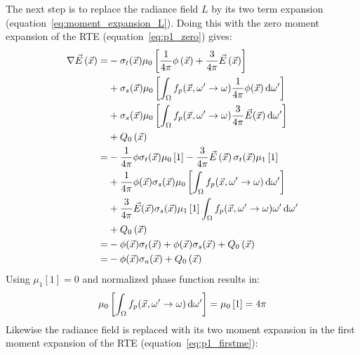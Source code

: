 The next step is to replace the radiance field $L$ by its two term expansion (equation~\ref{eq:moment_expansion_L}). Doing this with the zero moment expansion of the RTE (equation~\ref{eq:p1_zero}) gives:
\begin{align*}
\nabla\vec{E}\left(\vec{x}\right)=
&
-\sigma_t(\vec{x})\mu_0\left[\frac{1}{4\pi}\phi\left(\vec{x}\right) + \frac{3}{4\pi}\vec{E}\left(\vec{x}\right)\right]
\\
&
+\sigma_s(\vec{x})\mu_0\left[\int_{\Omega}f_p(\vec{x}, \omega'\rightarrow\omega)\frac{1}{4\pi}\phi(\vec{x})\,\mathrm{d}\omega'\right]
\\
&
+\sigma_s(\vec{x})\mu_0\left[\int_{\Omega}f_p(\vec{x}, \omega'\rightarrow\omega)\frac{3}{4\pi}\vec{E}(\vec{x})\,\mathrm{d}\omega'\right]
\\
&
\nonumber
+ Q_0\left(\vec{x}\right)
\\
=&
-\frac{1}{4\pi}\phi\sigma_t(\vec{x})\mu_0\left[1\right] - \frac{3}{4\pi}\vec{E}\left(\vec{x}\right)\sigma_t(\vec{x})\mu_1\left[1\right]
\\
&
+\frac{1}{4\pi}\phi(\vec{x})\sigma_s(\vec{x})\mu_0\left[\int_{\Omega}f_p(\vec{x}, \omega'\rightarrow\omega)\,\mathrm{d}\omega'\right]
\\
&
+\frac{3}{4\pi}\vec{E}(\vec{x})\sigma_s(\vec{x})\mu_1\left[1\right]\int_{\Omega}f_p(\vec{x}, \omega'\rightarrow\omega)\omega'\,\mathrm{d}\omega'
\\
&
+ Q_0\left(\vec{x}\right)
\\
=&
-\phi(\vec{x})\sigma_t(\vec{x})
+\phi(\vec{x})\sigma_s(\vec{x})
+Q_0\left(\vec{x}\right)
\\
=&
-\phi(\vec{x})\sigma_a(\vec{x})
+Q_0\left(\vec{x}\right)
\end{align*}
Using $\mu_1[1] = 0$ and normalized phase function results in:
\begin{align*}
\mu_0\left[\int_{\Omega}f_p(\vec{x}, \omega'\rightarrow\omega)\,\mathrm{d}\omega'\right] = \mu_0\left[1\right] = 4\pi
\end{align*}
Likewise the radiance field is replaced with its two moment expansion in the first moment expansion of the RTE (equation~\ref{eq:p1_firstme}):
